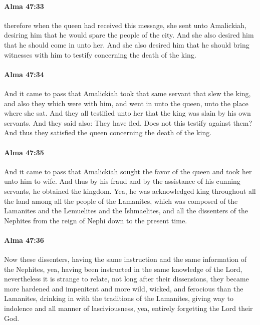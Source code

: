		\paragraph{Alma 47:33} %
			\label{ALMA-47-33}

			therefore when the queen had received this message,
			she sent unto Amalickiah,
			desiring him that he would spare the people of the city.
			And she also desired him that he should come in unto her.
			And she also desired him that he should bring witnesses with him
			to testify concerning the death of the king.

		\paragraph{Alma 47:34} %
			\label{ALMA-47-34}

			And it came to pass that
			Amalickiah took that same servant that slew the king,
			and also they which were with him,
			and went in unto the queen, unto the place where she sat.
			And they all testified unto her that the king was slain by his own servants.
			And they said also:
			They have fled.
			Does not this testify against them?
			And thus they satisfied the queen concerning the death of the king.

		\paragraph{Alma 47:35} %
			\label{ALMA-47-35}

			And it came to pass that
			Amalickiah sought the favor of the queen and took her unto him to wife.
			And thus by his fraud and by the assistance of his cunning servants,
			he obtained the kingdom.
			Yea, he was acknowledged king throughout all the land
			among all the people of the Lamanites,
			which was composed of the Lamanites and the Lemuelites and the Ishmaelites,
			and all the dissenters of the Nephites
			from the reign of Nephi down to the present time.

		\paragraph{Alma 47:36} %
			\label{ALMA-47-36}

			Now these dissenters,
			having the same instruction and the same information of the Nephites,
			yea, having been instructed in the same knowledge of the Lord,
			nevertheless it is strange to relate,
			not long after their dissensions,
			they became more hardened and impenitent
			and more wild, wicked, and ferocious than the Lamanites,
			drinking in with the traditions of the Lamanites,
			giving way to indolence and all manner of lasciviousness,
			yea, entirely forgetting the Lord their God.

